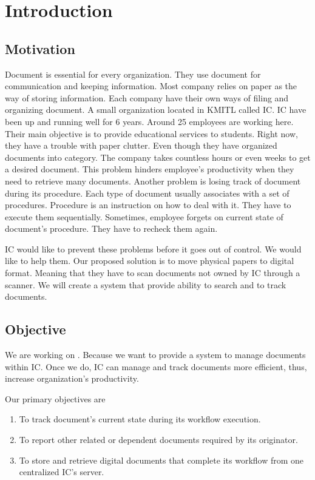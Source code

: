 \chapter{Introduction}

\section{Motivation}
Document is essential for every organization. 
They use document for communication and keeping information.
Most company relies on paper as the way of storing information.
Each company have their own ways of filing and organizing document. 
A small organization located in KMITL called IC. 
IC have been up and running well for 6 years. Around 25 employees are working here. 
Their main objective is to provide educational services to students. 
Right now, they have a trouble with paper clutter. 
Even though they have organized documents into category. 
The company takes countless hours or even weeks to get a desired document. 
This problem hinders employee's productivity when they need to retrieve many documents. 
Another problem is losing track of document during its procedure. 
Each type of document usually associates with a set of procedures. 
Procedure is an instruction on how to deal with it. 
They have to execute them sequentially. 
Sometimes, employee forgets on current state of document's procedure. 
They have to recheck them again.

IC would like to prevent these problems before it goes out of control. 
We would like to help them. 
Our proposed solution is to move physical papers to digital format. 
Meaning that they have to scan documents not owned by IC through a scanner. 
We will create a system that provide ability to search and to track documents.

\section{Objective}
We are working on \dms.
Because we want to provide a system to manage documents within IC.
Once we do, IC can manage and track documents more efficient, thus, increase organization's productivity.

Our primary objectives are
\begin{enumerate}
\item To track document's current state during its workflow execution.
\item To report other related or dependent documents required by its originator.
\item To store and retrieve digital documents that complete its workflow from one centralized IC's server.
\end{enumerate}

